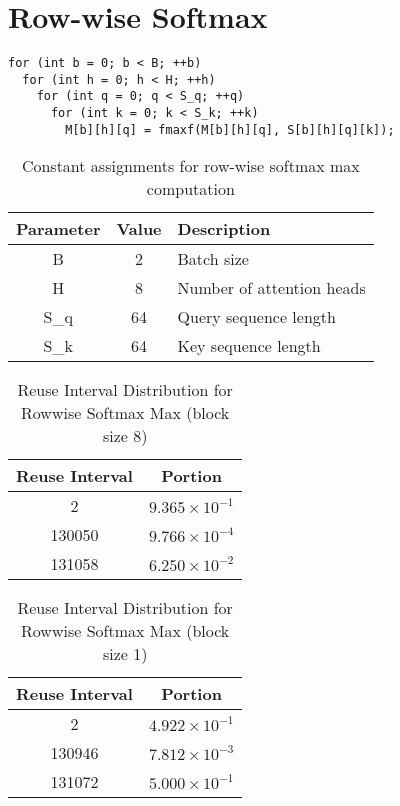 \documentclass[conference]{article}
\begin{document}
\section{Row-wise Softmax}
\begin{verbatim}
for (int b = 0; b < B; ++b)
  for (int h = 0; h < H; ++h)
    for (int q = 0; q < S_q; ++q)
      for (int k = 0; k < S_k; ++k)
        M[b][h][q] = fmaxf(M[b][h][q], S[b][h][q][k]);
\end{verbatim}
\begin{table}[H]
\centering
\begin{tabular}{|c|c|l|}
\hline
Parameter & Value & Description \\
\hline
B & 2 & Batch size \\
H & 8 & Number of attention heads \\
S\_q & 64 & Query sequence length \\
S\_k & 64 & Key sequence length \\
\hline
\end{tabular}
\caption{Constant assignments for row-wise softmax max computation}
\end{table}

\begin{table}[H]
\centering
\begin{tabular}{|c|c|}
    \hline
    Reuse Interval & Portion \\ 
    \hline
    2 & $9.365 \times 10^{-1}$ \\ 
    130050 & $9.766 \times 10^{-4}$ \\ 
    131058 & $6.250 \times 10^{-2}$ \\ 
    \hline
\end{tabular}
\caption{Reuse Interval Distribution for Rowwise Softmax Max (block size 8)}
\end{table}

\begin{table}[H]
\centering
\begin{tabular}{|c|c|}
    \hline
    Reuse Interval & Portion \\ 
    \hline
    2 & $4.922 \times 10^{-1}$ \\ 
    130946 & $7.812 \times 10^{-3}$ \\ 
    131072 & $5.000 \times 10^{-1}$ \\ 
    \hline
\end{tabular}
\caption{Reuse Interval Distribution for Rowwise Softmax Max (block size 1)}
\end{table}
\end{document}
